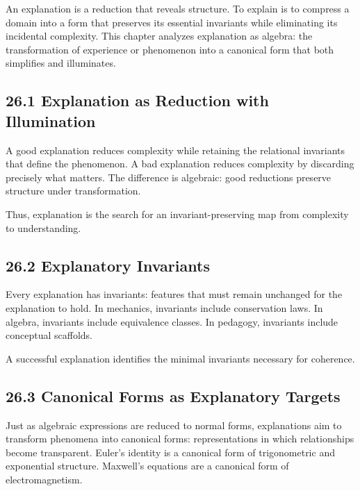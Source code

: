 \documentclass[12pt,letterpaper]{article}
\theoremstyle{remark}
\begin{document}
An explanation is a reduction that reveals structure. To explain is to compress a domain into a form that preserves its essential invariants while eliminating its incidental complexity. This chapter analyzes explanation as algebra: the transformation of experience or phenomenon into a canonical form that both simplifies and illuminates.

\subsection{26.1 Explanation as Reduction with Illumination}

A good explanation reduces complexity while retaining the relational invariants that define the phenomenon. A bad explanation reduces complexity by discarding precisely what matters. The difference is algebraic: good reductions preserve structure under transformation.

Thus, explanation is the search for an invariant-preserving map from complexity to understanding.

\subsection{26.2 Explanatory Invariants}

Every explanation has invariants: features that must remain unchanged for the explanation to hold. In mechanics, invariants include conservation laws. In algebra, invariants include equivalence classes. In pedagogy, invariants include conceptual scaffolds.

A successful explanation identifies the minimal invariants necessary for coherence.

\subsection{26.3 Canonical Forms as Explanatory Targets}

Just as algebraic expressions are reduced to normal forms, explanations aim to transform phenomena into canonical forms: representations in which relationships become transparent. Euler’s identity is a canonical form of trigonometric and exponential structure. Maxwell’s equations are a canonical form of electromagnetism.
\end{document}
